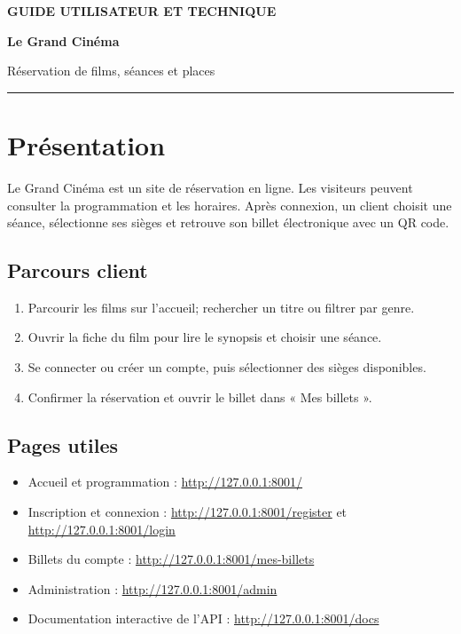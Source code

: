 \documentclass[11pt,a4paper]{article}
\begin{document}
\begin{center}
{\small\bfseries\color{gold} GUIDE UTILISATEUR ET TECHNIQUE}\par\vspace{8pt}
{\Huge\bfseries\color{navy} Le Grand Cinéma}\par\vspace{5pt}
{\large Réservation de films, séances et places}\par\vspace{13pt}
\color{gold}\rule{0.7\linewidth}{2pt}
\end{center}

\section{Présentation}
Le Grand Cinéma est un site de réservation en ligne. Les visiteurs peuvent consulter la programmation et les horaires. Après connexion, un client choisit une séance, sélectionne ses sièges et retrouve son billet électronique avec un QR code.

\subsection{Parcours client}
\begin{enumerate}[leftmargin=1.6em,itemsep=5pt]
  \item Parcourir les films sur l'accueil; rechercher un titre ou filtrer par genre.
  \item Ouvrir la fiche du film pour lire le synopsis et choisir une séance.
  \item Se connecter ou créer un compte, puis sélectionner des sièges disponibles.
  \item Confirmer la réservation et ouvrir le billet dans « Mes billets ».
\end{enumerate}

\subsection{Pages utiles}
\begin{itemize}
  \item Accueil et programmation : \url{http://127.0.0.1:8001/}
  \item Inscription et connexion : \url{http://127.0.0.1:8001/register} et \url{http://127.0.0.1:8001/login}
  \item Billets du compte : \url{http://127.0.0.1:8001/mes-billets}
  \item Administration : \url{http://127.0.0.1:8001/admin}
  \item Documentation interactive de l'API : \url{http://127.0.0.1:8001/docs}
\end{itemize}
\end{document}
